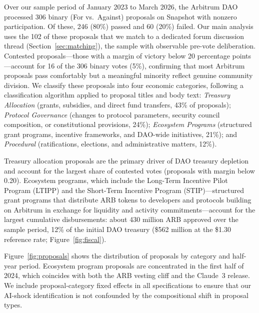 \documentclass[12pt]{article}
\begin{document}
Over our sample period of January 2023 to March 2026, the Arbitrum DAO processed
306 binary (For vs.\ Against) proposals on Snapshot with nonzero participation.
Of these, 246 (80\%) passed and 60 (20\%) failed. Our main analysis uses the 102 of these proposals that we match to a dedicated
forum discussion thread (Section~\ref{sec:matching}), the sample with observable
pre-vote deliberation.
Contested proposals---those with a margin of victory below 20 percentage
points---account for 16 of the 306 binary votes (5\%), confirming that most
Arbitrum proposals pass comfortably but a meaningful minority reflect genuine
community division. We classify these proposals into four economic categories, following a
classification algorithm applied to proposal titles and body text:
\emph{Treasury Allocation} (grants, subsidies, and direct fund transfers, 43\%
of proposals); \emph{Protocol Governance} (changes to protocol parameters,
security council composition, or constitutional provisions, 24\%);
\emph{Ecosystem Programs} (structured grant programs, incentive frameworks, and
DAO-wide initiatives, 21\%); and \emph{Procedural} (ratifications, elections,
and administrative matters, 12\%).

Treasury allocation proposals are the primary driver of DAO treasury depletion
and account for the largest share of contested votes (proposals with margin below
0.20). Ecosystem programs, which include the Long-Term Incentive Pilot Program
(LTIPP) and the Short-Term Incentive Program (STIP)---structured grant programs
that distribute ARB tokens to developers and protocols building on Arbitrum in
exchange for liquidity and activity commitments---account for the largest
cumulative disbursements: about 430 million ARB approved over the sample period, 12\% of the initial DAO treasury
(\$562 million at the \$1.30 reference rate; Figure~\ref{fig:fiscal}).

Figure~\ref{fig:proposals} shows the distribution of proposals by category and
half-year period. Ecosystem program proposals are concentrated
in the first half of 2024, which coincides with both the ARB vesting cliff
and the Claude~3 release. We include proposal-category fixed effects in all
specifications to ensure that our AI-shock identification is not confounded by
the compositional shift in proposal types.
\end{document}
